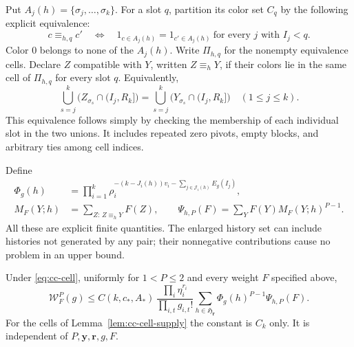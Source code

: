 Put $A_j(h)=\{\sigma_j,\ldots,\sigma_k\}$. For a slot $q$,
partition its color set $C_q$ by the following explicit equivalence:
\begin{equation}\label{eq:cc-slot-partition}
 c\equiv_{h,q}c'\quad\Longleftrightarrow\quad
 1_{c\in A_j(h)}=1_{c'\in A_j(h)}
       \ \text{for every }j\text{ with }I_j<q.
\end{equation}
Color $0$ belongs to none of the $A_j(h)$. Write $\Pi_{h,q}$ for
the nonempty equivalence cells. Declare $Z$ compatible with $Y$,
written $Z\equiv_hY$, if their colors lie in the same cell of
$\Pi_{h,q}$ for every slot $q$. Equivalently,
\begin{equation}\label{eq:cc-union-compatibility}
 \bigcup_{s=j}^k\bigl(Z_{\sigma_s}\cap(I_j,R_k]\bigr)
 =\bigcup_{s=j}^k\bigl(Y_{\sigma_s}\cap(I_j,R_k]\bigr)
                         \quad(1\le j\le k).
\end{equation}
This equivalence follows simply by checking the membership of each
individual slot in the two unions. It includes repeated zero pivots,
empty blocks, and arbitrary ties among cell indices.

Define
\begin{align}
 \Phi_g(h)&=\prod_{i=1}^k
  \rho_i^{-(k-J_i(h))v_i-\sum_{j\in\mathcal J_i(h)}E_g(I_j)},
                                                     \label{eq:cc-phi}\\
 M_F(Y;h)&=\sum_{Z:\,Z\equiv_hY}F(Z),\qquad
 \Psi_{h,P}(F)=\sum_YF(Y)M_F(Y;h)^{P-1}.
                                                     \label{eq:cc-psi}
\end{align}
All these are explicit finite quantities. The enlarged history set
can include histories not generated by any pair; their nonnegative
contributions cause no problem in an upper bound.

\begin{theorem}
\label{thm:correlated-collision-kernel}
Under \eqref{eq:cc-cell}, uniformly for $1<P\le2$ and every weight
$F$ specified above,
\begin{equation}\label{eq:cc-kernel}
 \boxed{\displaystyle
 \mathcal W_F^P(g)
 \le C(k,c_*,A_*)\,
       \frac{\prod_i\eta_i^{r_i}}{\prod_{i,t}g_{i,t}!}
       \sum_{h\in\mathfrak H_{\mathbf r}}
                 \Phi_g(h)^{P-1}\Psi_{h,P}(F).}
\end{equation}
For the cells of Lemma~\ref{lem:cc-cell-supply} the constant is
$C_k$ only. It is independent of $P,\mathbf y,\mathbf r,g,F$.
\end{theorem}

